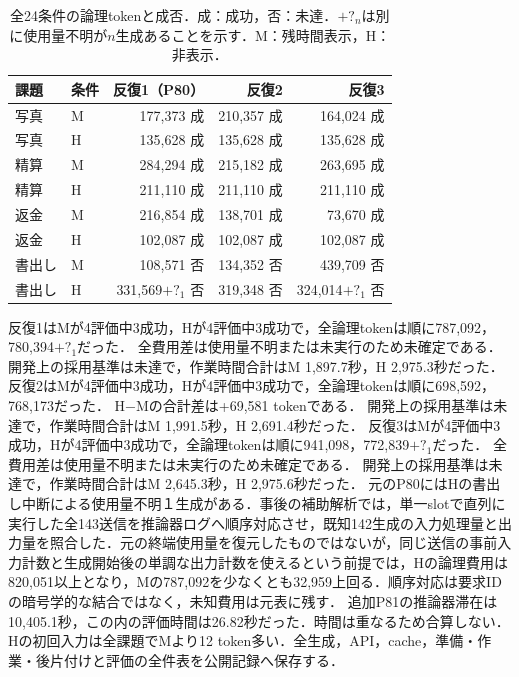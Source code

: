 \begin{table}[tb]
\centering\scriptsize\setlength{\tabcolsep}{2pt}
\caption{全24条件の論理tokenと成否．成：成功，否：未達．$+?_{n}$は別に使用量不明が$n$生成あることを示す．M：残時間表示，H：非表示．}
\begin{tabular}{llrrr}
課題 & 条件 & 反復1（P80） & 反復2 & 反復3 \\ \hline
写真 & M & 177,373 成 & 210,357 成 & 164,024 成 \\
写真 & H & 135,628 成 & 135,628 成 & 135,628 成 \\
精算 & M & 284,294 成 & 215,182 成 & 263,695 成 \\
精算 & H & 211,110 成 & 211,110 成 & 211,110 成 \\
返金 & M & 216,854 成 & 138,701 成 & 73,670 成 \\
返金 & H & 102,087 成 & 102,087 成 & 102,087 成 \\
書出し & M & 108,571 否 & 134,352 否 & 439,709 否 \\
書出し & H & 331,569$+?_{1}$ 否 & 319,348 否 & 324,014$+?_{1}$ 否 \\
\hline
\end{tabular}
\end{table}
反復1はMが4評価中3成功，Hが4評価中3成功で，全論理tokenは順に787,092，780,394$+?_{1}$だった．
全費用差は使用量不明または未実行のため未確定である．
開発上の採用基準は未達で，作業時間合計はM 1,897.7秒，H 2,975.3秒だった．
反復2はMが4評価中3成功，Hが4評価中3成功で，全論理tokenは順に698,592，768,173だった．
H−Mの合計差は+69,581 tokenである．
開発上の採用基準は未達で，作業時間合計はM 1,991.5秒，H 2,691.4秒だった．
反復3はMが4評価中3成功，Hが4評価中3成功で，全論理tokenは順に941,098，772,839$+?_{1}$だった．
全費用差は使用量不明または未実行のため未確定である．
開発上の採用基準は未達で，作業時間合計はM 2,645.3秒，H 2,975.6秒だった．
元のP80にはHの書出し中断による使用量不明１生成がある．事後の補助解析では，単一slotで直列に実行した全143送信を推論器ログへ順序対応させ，既知142生成の入力処理量と出力量を照合した．元の終端使用量を復元したものではないが，同じ送信の事前入力計数と生成開始後の単調な出力計数を使えるという前提では，Hの論理費用は820,051以上となり，Mの787,092を少なくとも32,959上回る．順序対応は要求IDの暗号学的な結合ではなく，未知費用は元表に残す．
追加P81の推論器滞在は10,405.1秒，この内の評価時間は26.82秒だった．時間は重なるため合算しない．Hの初回入力は全課題でMより12 token多い．全生成，API，cache，準備・作業・後片付けと評価の全件表を公開記録へ保存する．
